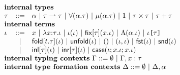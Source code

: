 $\begin{array}{lcl}%
\multicolumn{3}{>{$}l<{$}}{\textbf{internal types}}\\
\ity & ::= & \multicolumn{1}{l}{\alpha ~|~  \iparr{\ity}{\ity} ~|~ \iforall{\alpha}{\ity}  ~|~ \imu{\alpha}{\ity} ~|~ \iunit ~|~ \iprod{\ity}{\ity} ~|~ \isum{\ity}{\ity}}\\
\multicolumn{3}{>{$}l<{$}}{\textbf{internal terms}}\\
\itm & ::= & \multicolumn{1}{l}{x ~|~ \ilam{\ity}{x}{\itm} ~|~ \iap{\itm}{\itm} ~|~ \ifix{\ity}{x}{\itm} ~|~ \iLam{\alpha}{\itm} ~|~ \iAp{\ity}{\itm}}\\
& ~|~ & \multicolumn{1}{l}{\ifold{t}{\ity}{\itm} ~|~ \iunfold{\itm} ~|~ \itriv ~|~ \ipair{\itm}{\itm} ~|~ \ifst{\itm} ~|~ \isnd{\itm}}\\
& ~|~ & \iinl{\ity}{\itm} ~|~ \iinr{\ity}{\itm} ~|~ \icase{\itm}{x}{\itm}{x}{\itm}\\
\multicolumn{3}{l}{\textbf{internal typing contexts}~\Gamma ::= \emptyset ~|~ \Gamma, x : \tau}\\
\multicolumn{3}{l}{\textbf{internal type formation contexts}~\Delta ::= \emptyset ~|~ \Delta, \alpha}\\
\end{array}%
$